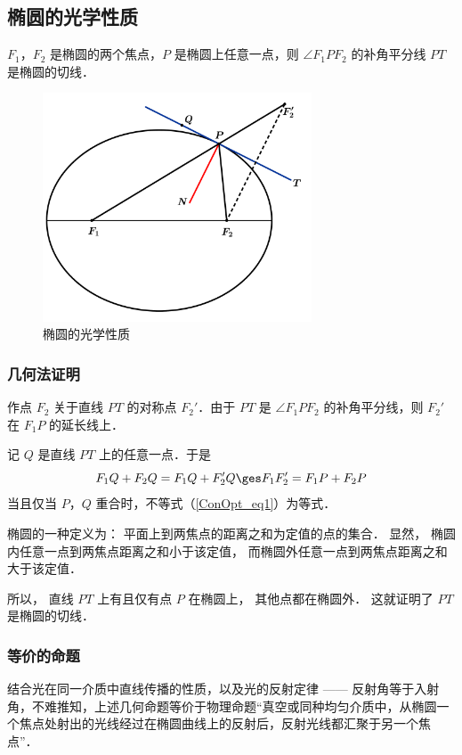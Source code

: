 \subsection{椭圆的光学性质}
$F_1$，$F_2$ 是椭圆的两个焦点，$ P $ 是椭圆上任意一点，则 $\angle F_1PF_2 $ 的补角平分线 $ PT $ 是椭圆的切线．
\begin{figure}[ht]
\centering
\includegraphics[width=8cm]{./figures/ConOpt3.pdf}
\caption{椭圆的光学性质} \label{ConOpt_fig3}
\end{figure}
\subsubsection{几何法证明}
作点 $F_2$ 关于直线 $PT$ 的对称点 $F_2'$．由于 $PT$ 是 $\angle F_1PF_2 $ 的补角平分线，则 $F_2'$ 在 $F_1P$ 的延长线上．

记 $Q$ 是直线 $PT$ 上的任意一点．于是
\begin{equation}\label{ConOpt_eq1}
F_1Q + F_2Q = F_1Q + F_2'Q \ges F_1F_2' = F_1P + F_2P
\end{equation}
当且仅当 $P$，$Q$ 重合时，不等式（\autoref{ConOpt_eq1}）为等式．

椭圆的一种定义为：
平面上到两焦点的距离之和为定值的点的集合． 显然， 椭圆内任意一点到两焦点距离之和小于该定值， 而椭圆外任意一点到两焦点距离之和大于该定值． 

所以， 直线 $PT$ 上有且仅有点 $P$ 在椭圆上， 其他点都在椭圆外． 这就证明了 $PT$ 是椭圆的切线．

\subsubsection{等价的命题}
结合光在同一介质中直线传播的性质，以及光的反射定律 —— 反射角等于入射角，不难推知，上述几何命题等价于物理命题“真空或同种均匀介质中，从椭圆一个焦点处射出的光线经过在椭圆曲线上的反射后，反射光线都汇聚于另一个焦点”．

